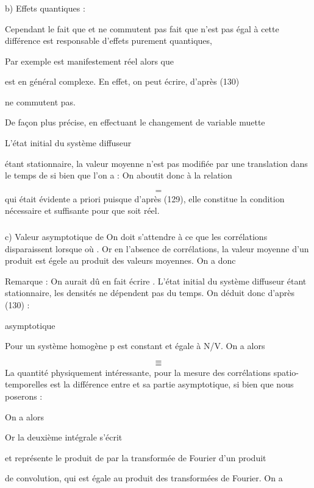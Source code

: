 {{{\subsubsection{}%
b) Effets quantiques :

Cependant le fait que  et  ne commutent pas fait que
 n'est pas égal à cette différence est responsable d'effets
purement quantiques,

Par exemple  est manifestement réel alors que 

est en général complexe. En effet, on peut écrire, d'après (130)

 ne commutent pas.

De façon plus précise, en effectuant le changement de variable muette


L'état initial du système diffuseur

étant stationnaire, la valeur moyenne  n'est pas modifiée par une
translation dans le temps de  si bien que l'on a :
On aboutit donc à la relation

\[
\tag{142}=
\]
qui était évidente a priori puisque d'après (129), elle constitue la condition
nécessaire et suffisante pour que  soit réel.
\subsubsection{}%
c) Valeur asymptotique de 
On doit s'attendre à ce que les corrélations disparaissent
lorsque  où . Or en l'absence de corrélations, la valeur
moyenne d'un produit est égele au produit des valeurs moyennes. On a donc

Remarque : On aurait dû en fait écrire . L'état initial du
système diffuseur étant stationnaire, les densités ne dépendent pas du temps.
On déduit donc d'après (130) :

asymptotique

Pour un système homogène p est constant et égale à N/V.
On a alors

\[
\tag{144}=
\]
\[
\tag{145}=
\]
La quantité physiquement intéressante, pour la mesure des corrélations
spatio-temporelles est la différence entre  et sa partie asymptotique, si bien que nous poserons :

On a alors

Or la deuxième intégrale s'écrit

et représente le produit de  par la transformée de Fourier d'un produit

de convolution, qui est égale au produit des transformées de Fourier. On a

}}}

